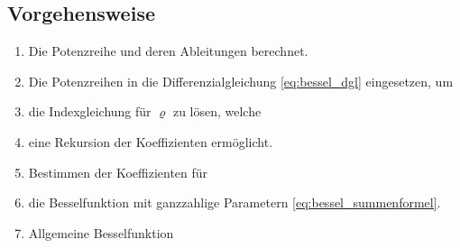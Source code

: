 \begin{refsection}
\subsection*{Vorgehensweise}
\begin{enumerate}
	\item Die Potenzreihe und deren Ableitungen berechnet.
	\item Die Potenzreihen in die Differenzialgleichung \ref{eq:bessel_dgl} eingesetzen, um
	\item die Indexgleichung f\"ur $\varrho$ zu l\"osen, welche
	\item eine Rekursion der Koeffizienten erm\"oglicht.
	\item Bestimmen der Koeffizienten f\"ur
	\item die Besselfunktion mit ganzzahlige Parametern \ref{eq:bessel_summenformel}.
	\item Allgemeine Besselfunktion
\end{enumerate}



\end{refsection}
